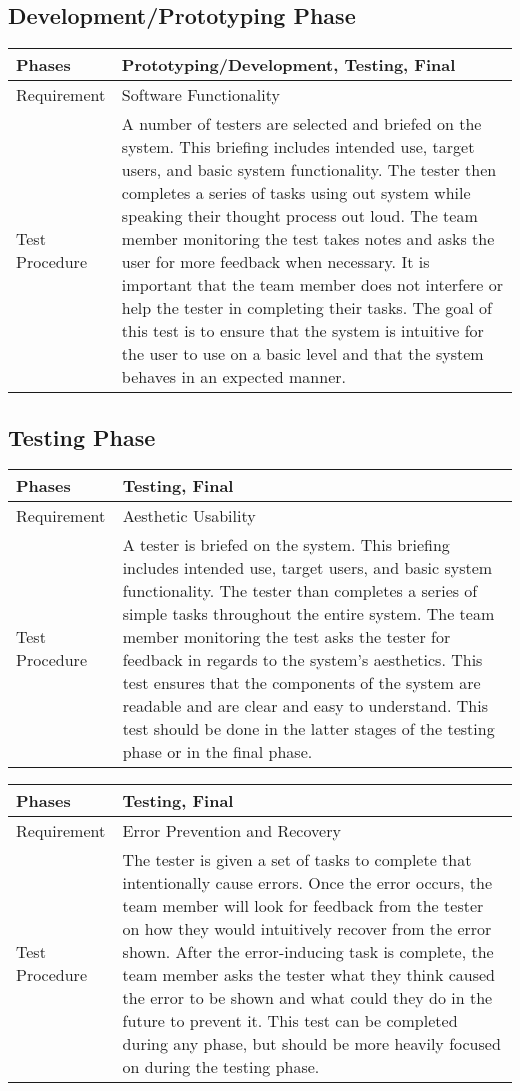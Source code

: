 \documentclass{article}
\begin{document}
\subsection{Development/Prototyping Phase}
\begin{tabular}{| l | p{12cm}  |}
    \hline
	Phases & Prototyping/Development, Testing, Final \\ \hline
	Requirement & Software Functionality \\ \hline
	Test Procedure & A number of testers are selected and briefed on the
	system. This briefing includes intended use, target users, and basic
	system functionality. The tester then completes a series of tasks using
	out system while speaking their thought process out loud. The team member
	monitoring the test takes notes and asks the user for more feedback when
	necessary. It is important that the team member does not interfere or help
	the tester in completing their tasks. The goal of this test is to ensure
	that the system is intuitive for the user to use on a basic level and that
	the system behaves in an expected manner.
	\\ \hline
\end{tabular}

\subsection{Testing Phase}
\begin{tabular}{| l | p{12cm}  |}
    \hline
	Phases & Testing, Final \\ \hline
	Requirement & Aesthetic Usability \\ \hline
	Test Procedure & A tester is briefed on the system. This briefing includes
	intended use, target users, and basic system functionality. The tester
	than completes a series of simple tasks throughout the entire system. The
	team member monitoring the test asks the tester for feedback in regards to
	the system's aesthetics. This test ensures that the components of the
	system are readable and are clear and easy to understand. This test should
	be done in the latter stages of the testing phase or in the final phase.
	\\ \hline
\end{tabular}

\begin{tabular}{| l | p{12cm}  |}
    \hline
	Phases & Testing, Final \\ \hline
	Requirement & Error Prevention and Recovery \\ \hline
	Test Procedure & The tester is given a set of tasks to complete that
	intentionally cause errors. Once the error occurs, the team member will
	look for feedback from the tester on how they would intuitively recover
	from the error shown. After the error-inducing task is complete, the team
	member asks the tester what they think caused the error to be shown and
	what could they do in the future to prevent it. This test can be completed
	during any phase, but should be more heavily focused on during the testing
	phase. \\ \hline
\end{tabular}
\end{document}
